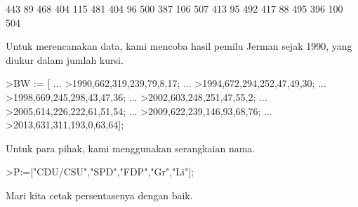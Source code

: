 \documentclass[a4paper,10pt]{article}
\begin{document}
\begin{eulernotebook}
\begin{euleroutput}
            443            89           468 
            404           115           481 
            404            96           500 
            387           106           507 
            413            95           492 
            417            88           495 
            396           100           504 
\end{euleroutput}
\begin{eulercomment}
Untuk merencanakan data, kami mencoba hasil pemilu Jerman sejak 1990,
yang diukur dalam jumlah kursi.
\end{eulercomment}
\begin{eulerprompt}
>BW := [ ...
>1990,662,319,239,79,8,17; ...
>1994,672,294,252,47,49,30; ...
>1998,669,245,298,43,47,36; ...
>2002,603,248,251,47,55,2; ...
>2005,614,226,222,61,51,54; ...
>2009,622,239,146,93,68,76; ...
>2013,631,311,193,0,63,64];
\end{eulerprompt}
\begin{eulercomment}
Untuk para pihak, kami menggunakan serangkaian nama.
\end{eulercomment}
\begin{eulerprompt}
>P:=["CDU/CSU","SPD","FDP","Gr","Li"];
\end{eulerprompt}
\begin{eulercomment}
Mari kita cetak persentasenya dengan baik.


\end{eulercomment}
\end{eulernotebook}
\end{document}
